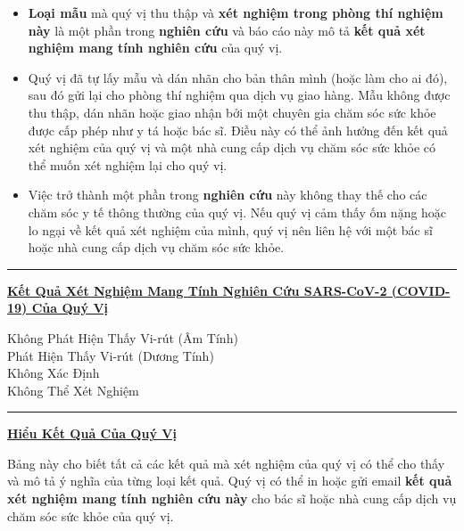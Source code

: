 \documentclass[10pt]{article}
\newcommand{\PageLine}{\rule{\textwidth}{0.25mm}}
\begin{document}
\begin{itemize}
\item

  \textbf{Loại mẫu} mà quý vị thu thập và \textbf{xét nghiệm trong phòng thí
  nghiệm này} là một phần trong \textbf{nghiên cứu} và báo cáo này mô tả
  \textbf{kết quả xét nghiệm mang tính nghiên cứu} của quý vị.

\item

  Quý vị đã tự lấy mẫu và dán nhãn cho bản thân mình (hoặc làm cho ai đó), sau
  đó gửi lại cho phòng thí nghiệm qua dịch vụ giao hàng. Mẫu không được thu
  thập, dán nhãn hoặc giao nhận bởi một chuyên gia chăm sóc sức khỏe được cấp
  phép như y tá hoặc bác sĩ. Điều này có thể ảnh hưởng đến kết quả xét nghiệm
  của quý vị và một nhà cung cấp dịch vụ chăm sóc sức khỏe có thể muốn xét
  nghiệm lại cho quý vị.

\item

  Việc trở thành một phần trong \textbf{nghiên cứu} này không thay thế cho các
  chăm sóc y tế thông thường của quý vị. Nếu quý vị cảm thấy ốm nặng hoặc lo
  ngại về kết quả xét nghiệm của mình, quý vị nên liên hệ với một bác sĩ hoặc
  nhà cung cấp dịch vụ chăm sóc sức khỏe.

\end{itemize}

\bigskip
\PageLine

\large \underline{\textbf{Kết Quả Xét Nghiệm Mang Tính Nghiên Cứu SARS-CoV-2
  (COVID-19) Của Quý Vị}}

Không Phát Hiện Thấy Vi-rút (Âm Tính)\\
Phát Hiện Thấy Vi-rút (Dương Tính)\\
Không Xác Định\\
Không Thể Xét Nghiệm\\

\PageLine
\bigskip

\large \underline{\textbf{Hiểu Kết Quả Của Quý Vị}}

Bảng này cho biết tất cả các kết quả mà xét nghiệm của quý vị có thể cho thấy và
mô tả ý nghĩa của từng loại kết quả. Quý vị có thể in hoặc gửi email
\textbf{kết quả xét nghiệm mang tính nghiên cứu này} cho bác sĩ hoặc nhà cung
cấp dịch vụ chăm sóc sức khỏe của quý vị.
\end{document}
